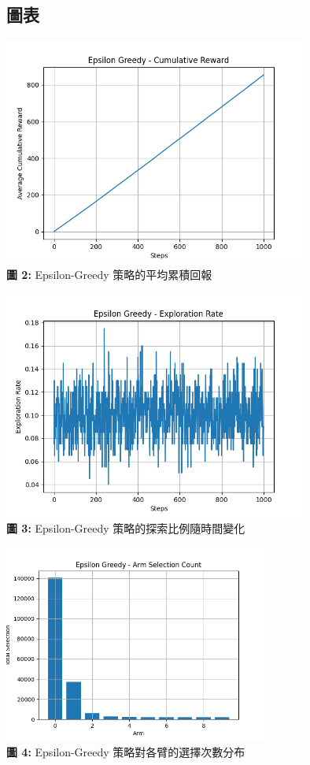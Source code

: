 \documentclass{article}
\begin{document}
\subsection*{圖表}
\begin{center}
\includegraphics[width=0.75\textwidth]{./plots/epsilon_greedy_reward.png} \\
\textbf{圖 2:} Epsilon-Greedy 策略的平均累積回報
\end{center}

\begin{center}
\includegraphics[width=0.75\textwidth]{./plots/epsilon_greedy_explore.png} \\
\textbf{圖 3:} Epsilon-Greedy 策略的探索比例隨時間變化
\end{center}

\begin{center}
\includegraphics[width=0.65\textwidth]{./plots/epsilon_greedy_armcount.png} \\
\textbf{圖 4:} Epsilon-Greedy 策略對各臂的選擇次數分布
\end{center}
\end{document}
